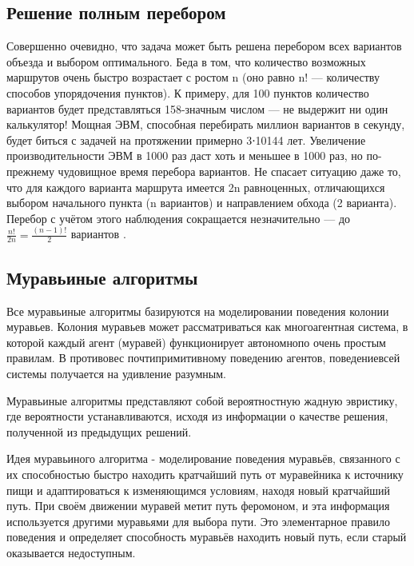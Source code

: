 \documentclass[a4paper, 14pt]{article}
\begin{document}
		\subsection{Решение полным перебором}
Совершенно очевидно, что задача может быть решена перебором всех вариантов объезда и выбором оптимального. Беда в том, что количество возможных маршрутов очень быстро возрастает с ростом n (оно равно n! — количеству способов упорядочения пунктов). К примеру, для 100 пунктов количество вариантов будет представляться 158-значным числом — не выдержит ни один калькулятор! Мощная ЭВМ, способная перебирать миллион вариантов в секунду, будет биться с задачей на протяжении примерно 3⋅10144 лет. Увеличение производительности ЭВМ в 1000 раз даст хоть и меньшее в 1000 раз, но по-прежнему чудовищное время перебора вариантов. Не спасает ситуацию даже то, что для каждого варианта маршрута имеется 2n равноценных, отличающихся выбором начального пункта (n вариантов) и направлением обхода (2 варианта). Перебор с учётом этого наблюдения сокращается незначительно — до $\frac{n!}{2n}=\frac{(n−1)!}{2}$ вариантов \cite{commi}.	
		\subsection{Муравьиные алгоритмы}
		Все муравьиные алгоритмы базируются на моделировании поведения колонии муравьев. Колония муравьев может рассматриваться как многоагентная система, в которой каждый агент (муравей) функционирует автономнопо очень простым правилам. В противовес почтипримитивному поведению агентов, поведениевсей системы получается на удивление разумным.
		
		Муравьиные алгоритмы представляют собой вероятностную жадную эвристику, где вероятности устанавливаются, исходя из информации о качестве решения, полученной из предыдущих решений.

Идея муравьиного алгоритма - моделирование поведения муравьёв, связанного с их способностью быстро находить кратчайший путь от муравейника к источнику пищи и адаптироваться к изменяющимся условиям, находя новый кратчайший путь\cite{ant1}. При своём движении муравей метит путь феромоном, и эта информация используется другими муравьями для выбора пути. Это элементарное правило поведения и определяет способность муравьёв находить новый путь, если старый оказывается недоступным.
\end{document}
